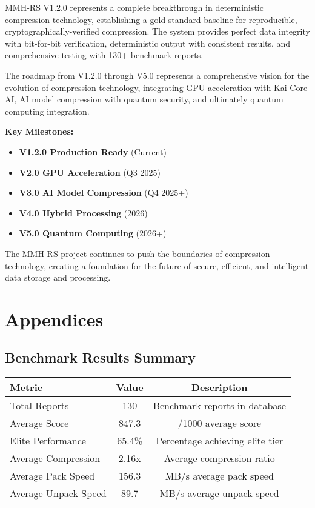 \documentclass[12pt,a4paper]{article}
\begin{document}
MMH-RS V1.2.0 represents a complete breakthrough in deterministic compression technology, establishing a gold standard baseline for reproducible, cryptographically-verified compression. The system provides perfect data integrity with bit-for-bit verification, deterministic output with consistent results, and comprehensive testing with 130+ benchmark reports.

The roadmap from V1.2.0 through V5.0 represents a comprehensive vision for the evolution of compression technology, integrating GPU acceleration with Kai Core AI, AI model compression with quantum security, and ultimately quantum computing integration.

\textbf{Key Milestones:}
\begin{itemize}
    \item \textbf{V1.2.0 Production Ready} (Current)
    \item \textbf{V2.0 GPU Acceleration} (Q3 2025)
    \item \textbf{V3.0 AI Model Compression} (Q4 2025+)
    \item \textbf{V4.0 Hybrid Processing} (2026)
    \item \textbf{V5.0 Quantum Computing} (2026+)
\end{itemize}

The MMH-RS project continues to push the boundaries of compression technology, creating a foundation for the future of secure, efficient, and intelligent data storage and processing.

\newpage

\section{Appendices}

\subsection{Benchmark Results Summary}
\begin{center}
\begin{tabular}{|l|c|c|}
\hline
\textbf{Metric} & \textbf{Value} & \textbf{Description} \\
\hline
Total Reports & 130 & Benchmark reports in database \\
Average Score & 847.3 & /1000 average score \\
Elite Performance & 65.4\% & Percentage achieving elite tier \\
Average Compression & 2.16x & Average compression ratio \\
Average Pack Speed & 156.3 & MB/s average pack speed \\
Average Unpack Speed & 89.7 & MB/s average unpack speed \\
\hline
\end{tabular}
\end{center}
\end{document}
